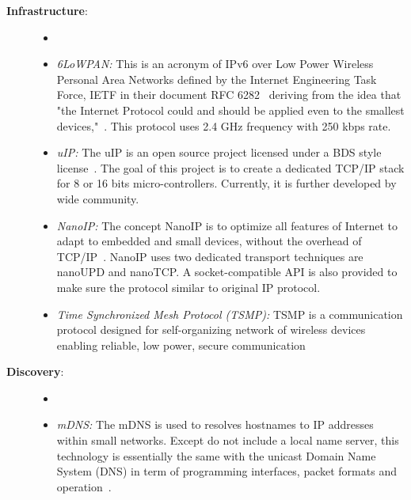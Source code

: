 \begin{description}
\item[\textbf{Infrastructure}:\\]
    \begin{itemize}
    \item[] 
    \item \textit{6LoWPAN: } This is an acronym of IPv6 over Low Power Wireless Personal Area Networks defined by the Internet Engineering Task Force, IETF in their document RFC 6282~\cite{shelby20116lowpan} deriving from the idea that "the Internet Protocol could and should be applied even to the smallest devices,"~\cite{Mulligan:2007:ARC:1278972.1278992}. This protocol uses 2.4 GHz frequency with 250 kbps rate.
    
    \item \textit{uIP: } The uIP is an open source project licensed under a BDS style license~\cite{adamdunk86:online}. The goal of this project is to create a dedicated TCP/IP stack for 8 or 16 bits micro-controllers. Currently, it is further developed by wide community.
    
    \item \textit{NanoIP: } The concept NanoIP is to optimize all features of Internet to adapt to embedded and small devices, without the overhead of TCP/IP~\cite{shelby2003nanoip}. NanoIP uses two dedicated transport techniques are nanoUPD and nanoTCP. A socket-compatible API is also provided to make sure the protocol similar to original IP protocol.
    
    \item \textit{Time Synchronized Mesh Protocol (TSMP): } TSMP is a communication protocol designed for self-organizing network of wireless devices enabling reliable, low power, secure communication~\cite{pister2008tsmp} 
    
    \end{itemize}

\item[\textbf{Discovery}:\\]
    \begin{itemize}
    \item[] 
    \item \textit{mDNS: } The mDNS is used to resolves hostnames to IP addresses within small networks. Except do not include a local name server,  this technology is essentially the same with the unicast Domain Name System (DNS) in term of programming interfaces, packet formats and operation~\cite{cheshire2013multicast}. 
    

\end{itemize}
\end{description}
